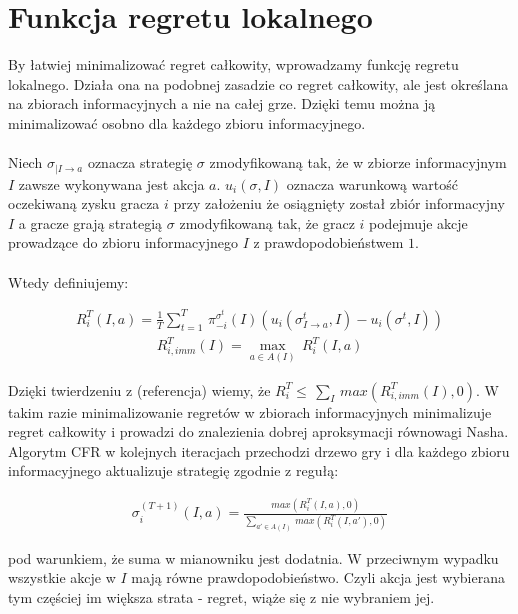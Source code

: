 \documentclass[licencjacka]{pracamgr}
\begin{document}
\section{Funkcja regretu lokalnego}

By łatwiej minimalizować regret całkowity, wprowadzamy funkcję regretu lokalnego.
Działa ona na podobnej zasadzie co regret całkowity, ale jest określana na zbiorach informacyjnych
a nie na całej grze. Dzięki temu można ją minimalizować osobno dla każdego zbioru informacyjnego. \\\\

\noindent
Niech $\sigma_{|I \rightarrow a}$ oznacza strategię $\sigma$ zmodyfikowaną tak, że w zbiorze informacyjnym $I$ zawsze
wykonywana jest akcja $a$. $u_i(\sigma, I)$ oznacza warunkową wartość oczekiwaną zysku gracza $i$ przy założeniu że
osiągnięty został zbiór informacyjny $I$ a gracze grają strategią $\sigma$ zmodyfikowaną tak, że gracz $i$
podejmuje akcje prowadzące do zbioru informacyjnego $I$ z prawdopodobieństwem $1$. \\\\

\noindent
Wtedy definiujemy:

\begin{align*}
R_i^T(I, a) = \frac{1}{T} \sum\limits_{t=1}^{T} \, \pi_{-i}^{\sigma^t}(I)(u_i(\sigma^t_{I \rightarrow a}, I) - u_i(\sigma^t, I))
\end{align*}
\begin{align*}
R_{i, imm}^T(I) = \max_{a \in A(I)} \, R_i^T(I, a)
\end{align*}

\noindent
Dzięki twierdzeniu z (referencja) wiemy, że $R_i^T \leq \, \sum_{I} \, max(R_{i, imm}^T(I), 0)$. W takim razie
minimalizowanie regretów w zbiorach informacyjnych minimalizuje regret całkowity i prowadzi do znalezienia
dobrej aproksymacji równowagi Nasha. \\

\noindent
Algorytm CFR w kolejnych iteracjach przechodzi drzewo gry i dla każdego zbioru informacyjnego aktualizuje strategię
zgodnie z regułą:

\begin{align*}
\sigma_i^(T+1) (I, a) = \frac{max(R_i^T(I, a), 0)}{\sum\limits_{a' \in A(I)} \, max(R_i^T(I, a'), 0)}
\end{align*}

\noindent
pod warunkiem, że suma w mianowniku jest dodatnia. W przeciwnym wypadku wszystkie akcje w $I$ mają równe prawdopodobieństwo.
Czyli akcja jest wybierana tym częściej im większa strata - regret, wiąże się z nie wybraniem jej.\\\\
\end{document}
